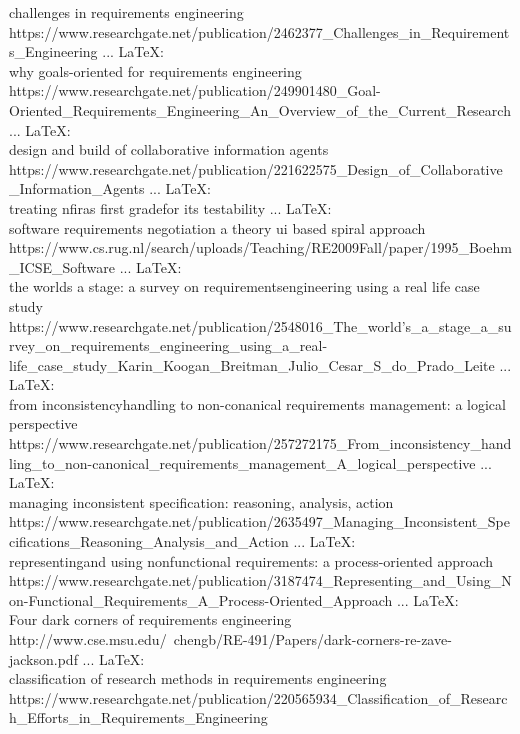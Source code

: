 challenges in requirements engineering
https://www.researchgate.net/publication/2462377_Challenges_in_Requirements_Engineering
\bibitem{ } ... \LaTeX:\\ \url{ }
why goals-oriented for requirements engineering
https://www.researchgate.net/publication/249901480_Goal-Oriented_Requirements_Engineering_An_Overview_of_the_Current_Research
\bibitem{ } ... \LaTeX:\\ \url{ }
design and build of collaborative information agents
https://www.researchgate.net/publication/221622575_Design_of_Collaborative_Information_Agents
\bibitem{ } ... \LaTeX:\\ \url{ }
treating nfiras first gradefor its testability
\bibitem{ } ... \LaTeX:\\ \url{ }
software requirements negotiation a theory ui based spiral approach
https://www.cs.rug.nl/search/uploads/Teaching/RE2009Fall/paper/1995_Boehm_ICSE_Software%
\bibitem{ } ... \LaTeX:\\ \url{ }
the worlds a stage: a survey on requirementsengineering using a real life case study
https://www.researchgate.net/publication/2548016_The_world's_a_stage_a_survey_on_requirements_engineering_using_a_real-life_case_study_Karin_Koogan_Breitman_Julio_Cesar_S_do_Prado_Leite
\bibitem{ } ... \LaTeX:\\ \url{ }
from inconsistencyhandling to non-conanical requirements management: a logical perspective
https://www.researchgate.net/publication/257272175_From_inconsistency_handling_to_non-canonical_requirements_management_A_logical_perspective
\bibitem{ } ... \LaTeX:\\ \url{ }
managing inconsistent specification: reasoning, analysis, action
https://www.researchgate.net/publication/2635497_Managing_Inconsistent_Specifications_Reasoning_Analysis_and_Action 
\bibitem{ } ... \LaTeX:\\ \url{ }
representingand using nonfunctional requirements: a process-oriented approach
https://www.researchgate.net/publication/3187474_Representing_and_Using_Non-Functional_Requirements_A_Process-Oriented_Approach
\bibitem{ } ... \LaTeX:\\ \url{ }
Four dark corners of requirements engineering
http://www.cse.msu.edu/~chengb/RE-491/Papers/dark-corners-re-zave-jackson.pdf 
\bibitem{ } ... \LaTeX:\\ \url{ }
classification of research methods in requirements engineering
https://www.researchgate.net/publication/220565934_Classification_of_Research_Efforts_in_Requirements_Engineering

